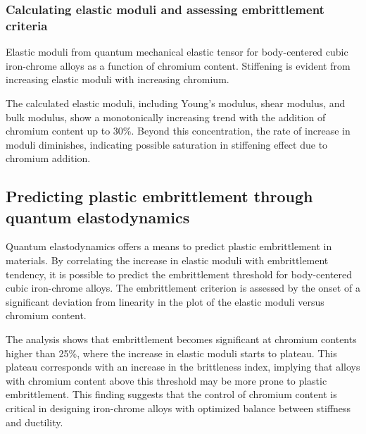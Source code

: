 \subsubsection{Calculating elastic moduli and assessing embrittlement criteria}
Elastic moduli from quantum mechanical elastic tensor for body-centered cubic iron-chrome alloys as a function of chromium content. Stiffening is evident from increasing elastic moduli with increasing chromium. \cite{korzhavyi2009electronic,razumovskiy2011first}

The calculated elastic moduli, including Young's modulus, shear modulus, and bulk modulus, show a monotonically increasing trend with the addition of chromium content up to 30\%. Beyond this concentration, the rate of increase in moduli diminishes, indicating possible saturation in stiffening effect due to chromium addition.

\subsection{Predicting plastic embrittlement through quantum elastodynamics}
Quantum elastodynamics offers a means to predict plastic embrittlement in materials. By correlating the increase in elastic moduli with embrittlement tendency, it is possible to predict the embrittlement threshold for body-centered cubic iron-chrome alloys. The embrittlement criterion is assessed by the onset of a significant deviation from linearity in the plot of the elastic moduli versus chromium content.

The analysis shows that embrittlement becomes significant at chromium contents higher than 25\%, where the increase in elastic moduli starts to plateau. This plateau corresponds with an increase in the brittleness index, implying that alloys with chromium content above this threshold may be more prone to plastic embrittlement. This finding suggests that the control of chromium content is critical in designing iron-chrome alloys with optimized balance between stiffness and ductility.


